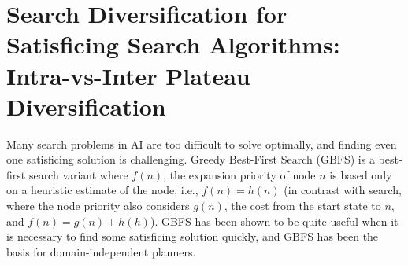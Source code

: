 
\chapter[Intra-vs-Inter Plateau Diversification]{Search Diversification for Satisficing Search Algorithms: Intra-vs-Inter Plateau Diversification}

\label{chap:sat}




Many search problems in AI are too difficult to solve optimally, and finding even one satisficing solution is challenging. 
Greedy Best-First Search (GBFS) is a best-first search variant where $f(n)$, the expansion priority of node $n$ is based only on a heuristic estimate of the node, i.e., $f(n) = h(n)$  (in contrast with \astar search, where the node priority also considers $g(n)$, the cost from the start state to $n$, and $f(n) = g(n)+h(h)$).
GBFS has been shown to be quite useful when it is necessary to find some  satisficing solution quickly, and GBFS 
has been the basis for \lsota domain-independent planners. %

